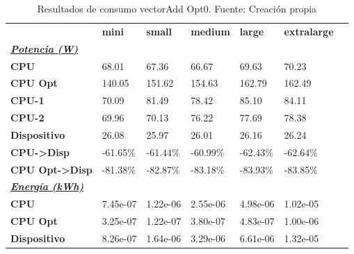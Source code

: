 \begin{table}[H]
    \centering
    \begin{tabular}{lllllll}
    \rowcolor[HTML]{DAE8FC} \ & \textbf{mini} & \textbf{small} & \textbf{medium} & \textbf{	large} & \textbf{	extralarge} \\
    \cellcolor[HTML]{DAE8FC} \textbf{\textbf{{\emph{{\underline{{Potencia (W)}}}}}}} &  &  &  & 	 & 	 \\
    \rowcolor[HTML]{EFEFEF} \cellcolor[HTML]{DAE8FC} \textbf{CPU} & 68.01 & 67.36 & 66.67 & 	69.63 & 	70.23 \\
    \cellcolor[HTML]{DAE8FC} \textbf{CPU Opt} & 140.05 & 151.62 & 154.63 & 	162.79 & 	162.49 \\
    \rowcolor[HTML]{EFEFEF} \cellcolor[HTML]{DAE8FC} \textbf{\quad CPU-1} & 70.09 & 81.49 & 78.42 & 	85.10 & 	84.11 \\
    \cellcolor[HTML]{DAE8FC} \textbf{\quad CPU-2} & 69.96 & 70.13 & 76.22 & 	77.69 & 	78.38 \\
    \rowcolor[HTML]{EFEFEF} \cellcolor[HTML]{DAE8FC} \textbf{Dispositivo} & 26.08 & 25.97 & 26.01 & 	26.16 & 	26.24 \\
    \cellcolor[HTML]{DAE8FC} \textbf{CPU->Disp} & -61.65\% & -61.44\% & -60.99\% & 	-62.43\% & 	-62.64\% \\
    \rowcolor[HTML]{EFEFEF} \cellcolor[HTML]{DAE8FC} \textbf{CPU Opt->Disp} & -81.38\% & -82.87\% & -83.18\% & 	-83.93\% & 	-83.85\% \\
    \cellcolor[HTML]{DAE8FC} \textbf{\textbf{{\emph{{\underline{{Energía (kWh)}}}}}}} &  &  &  & 	 & 	 \\
    \rowcolor[HTML]{EFEFEF} \cellcolor[HTML]{DAE8FC} \textbf{CPU} & 7.45e-07 & 1.22e-06 & 2.55e-06 & 	4.98e-06 & 	1.02e-05 \\
    \cellcolor[HTML]{DAE8FC} \textbf{CPU Opt} & 3.25e-07 & 1.22e-07 & 3.80e-07 & 	4.83e-07 & 	1.00e-06 \\
    \rowcolor[HTML]{EFEFEF} \cellcolor[HTML]{DAE8FC} \textbf{Dispositivo} & 8.26e-07 & 1.64e-06 & 3.29e-06 & 	6.61e-06 & 	1.32e-05 \\
    \end{tabular}
    \caption[Resultados de consumo vectorAdd Opt0]{{Resultados de consumo vectorAdd Opt0. Fuente: Creación propia}}
    \label{table_test_vectorAdd_Opt0_hw_powerResults}
\end{table}